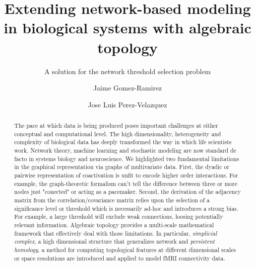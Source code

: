 \documentclass[onecollarge,runningheads]{svjour2}
\begin{document}
\title{Extending network-based modeling in biological systems with algebraic topology 
}
\subtitle{A solution for the network threshold selection problem\\ }
\author{Jaime Gomez-Ramirez        \and
        Jose Luis Perez-Velazquez %
}
\maketitle

\begin{abstract}
The pace at which data is being produced poses important challenges at either conceptual and computational level. The high dimensionality, heterogeneity and complexity of biological data has deeply transformed the way in which life scientists work. Network theory, machine learning and stochastic modeling are now standard de facto in systems biology and neuroscience. 
We highlighted two fundamental limitations in the graphical representation via graphs of multivariate data. First, the dyadic or pairwise representation of coactivation is unfit to encode higher order interactions. For example, the graph-theoretic formalism can't tell the difference between three or more nodes just "conected" or acting as a pacemaker. Second, the derivation of the adjacency matrix from the correlation/covariance matrix relies upon the selection of a significance level or threshold which is necessarily ad-hoc and introduces a strong bias. For example, a large threshold will exclude weak connections, loosing potentially relevant information. 
Algebraic topology provides a multi-scale mathematical framework that effectively deal with those limitations. In particular, \emph{simplicial complex}, a high dimensional structure that generalizes network and \emph{persistent homology}, a method for computing topological features at different dimensional scales or space resolutions are introduced and applied to model fMRI connectivity data.

\end{abstract}
\end{document}
